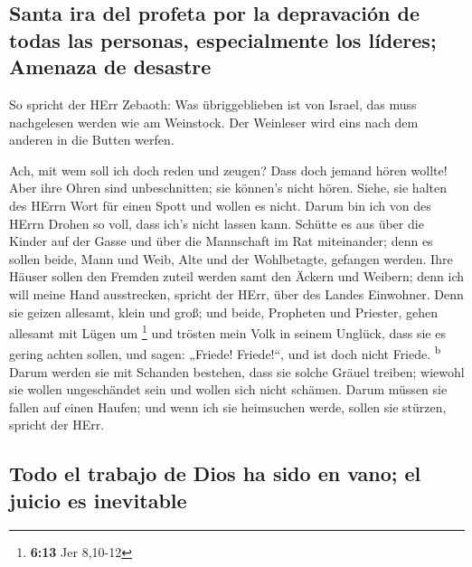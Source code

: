 \hypertarget{santa-ira-del-profeta-por-la-depravaciuxf3n-de-todas-las-personas-especialmente-los-luxedderes-amenaza-de-desastre}{%
\subsection{Santa ira del profeta por la depravación de todas las
personas, especialmente los líderes; Amenaza de
desastre}\label{santa-ira-del-profeta-por-la-depravaciuxf3n-de-todas-las-personas-especialmente-los-luxedderes-amenaza-de-desastre}}

 So spricht der HErr Zebaoth: Was übriggeblieben ist von
Israel, das muss nachgelesen werden wie am Weinstock. Der Weinleser wird
eins nach dem anderen in die Butten werfen.

 Ach, mit wem soll ich doch reden und zeugen? Dass doch
jemand hören wollte! Aber ihre Ohren sind unbeschnitten; sie können's
nicht hören. Siehe, sie halten des HErrn Wort für einen Spott und wollen
es nicht.  Darum bin ich von des HErrn Drohen so voll,
dass ich's nicht lassen kann. Schütte es aus über die Kinder auf der
Gasse und über die Mannschaft im Rat miteinander; denn es sollen beide,
Mann und Weib, Alte und der Wohlbetagte, gefangen werden.
 Ihre Häuser sollen den Fremden zuteil werden samt den
Äckern und Weibern; denn ich will meine Hand ausstrecken, spricht der
HErr, über des Landes Einwohner.  Denn sie geizen
allesamt, klein und groß; und beide, Propheten und Priester, gehen
allesamt mit Lügen um \footnote{\textbf{6:13} Jer 8,10-12}
 und trösten mein Volk in seinem Unglück, dass sie es
gering achten sollen, und sagen: „Friede! Friede!{}``, und ist doch
nicht Friede. \textsuperscript{b}  Darum werden sie mit
Schanden bestehen, dass sie solche Gräuel treiben; wiewohl sie wollen
ungeschändet sein und wollen sich nicht schämen. Darum müssen sie fallen
auf einen Haufen; und wenn ich sie heimsuchen werde, sollen sie stürzen,
spricht der HErr.

\hypertarget{todo-el-trabajo-de-dios-ha-sido-en-vano-el-juicio-es-inevitable}{%
\subsection{Todo el trabajo de Dios ha sido en vano; el juicio es
inevitable}\label{todo-el-trabajo-de-dios-ha-sido-en-vano-el-juicio-es-inevitable}}

